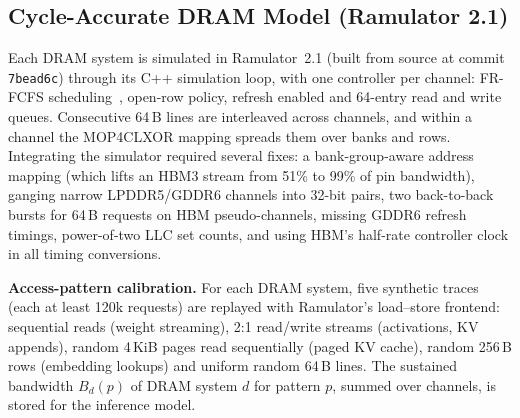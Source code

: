 \documentclass[12pt]{article}
\begin{document}
\begin{table}[htbp]
\centering
\caption{SPEC CPU 2026 traces (200M traced instructions each).}
\label{tab:traces}
\small
{}
\end{table}

\subsection{Cycle-Accurate DRAM Model (Ramulator 2.1)}
Each DRAM system is simulated in Ramulator~2.1 (built from source at commit \texttt{7bead6c}) through its C++ simulation loop, with one controller per channel: FR-FCFS scheduling~\cite{rixner2000}, open-row policy, refresh enabled and 64-entry read and write queues. Consecutive 64\,B lines are interleaved across channels, and within a channel the MOP4CLXOR mapping spreads them over banks and rows. Integrating the simulator required several fixes: a bank-group-aware address mapping (which lifts an HBM3 stream from 51\% to 99\% of pin bandwidth), ganging narrow LPDDR5/GDDR6 channels into 32-bit pairs, two back-to-back bursts for 64\,B requests on HBM pseudo-channels, missing GDDR6 refresh timings, power-of-two LLC set counts, and using HBM's half-rate controller clock in all timing conversions.



\textbf{Access-pattern calibration.} For each DRAM system, five synthetic traces (each at least 120k requests) are replayed with Ramulator's load--store frontend: sequential reads (weight streaming), 2:1 read/write streams (activations, KV appends), random 4\,KiB pages read sequentially (paged KV cache), random 256\,B rows (embedding lookups) and uniform random 64\,B lines. The sustained bandwidth $B_d(p)$ of DRAM system $d$ for pattern $p$, summed over channels, is stored for the inference model.
\end{document}
